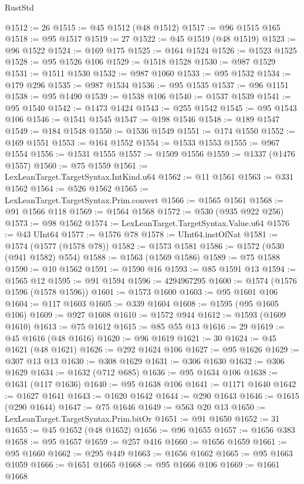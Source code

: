 \begin{lexlean}{RustStd}
\begin{coremodule}
{\begin{coremodule}
{{{{{{{{{{{{{{{{{{{{{{{{{{{{{{{{{{{{{{{@1512 := 26
@1515 := @45 @1512 (@48 @1512)
@1517 := @96 @1515 @165
@1518 := @95 @1517
@1519 := 27
@1522 := @45 @1519 (@48 @1519)
@1523 := @96 @1522
@1524 := @169 @175
@1525 := @164 @1524
@1526 := @1523 @1525
@1528 := @95 @1526 @106
@1529 := @1518 @1528
@1530 := @987 @1529
@1531 := @1511 @1530
@1532 := @987 @1060
@1533 := @95 @1532
@1534 := @179 @296
@1535 := @987 @1534
@1536 := @95 @1535
@1537 := @96 @1151
@1538 := @95 @1490
@1539 := @1538 @106
@1540 := @1537 @1539
@1541 := @95 @1540
@1542 := @1473 @1424
@1543 := @255 @1542
@1545 := @95 @1543 @106
@1546 := @1541 @1545
@1547 := @198 @1546
@1548 := @189 @1547
@1549 := @184 @1548
@1550 := @1536 @1549
@1551 := @174 @1550
@1552 := @169 @1551
@1553 := @164 @1552
@1554 := @1533 @1553
@1555 := @967 @1554
@1556 := @1531 @1555
@1557 := @1509 @1556
@1559 := @1337 (@1476 @1557)
@1560 := @75 @1559
@1561 := LexLeanTarget.TargetSyntax.IntKind.u64
@1562 := @11 @1561
@1563 := @331 @1562
@1564 := @526 @1562
@1565 := LexLeanTarget.TargetSyntax.Prim.convert
@1566 := @1565 @1561
@1568 := @91 @1566 @118
@1569 := @1564 @1568
@1572 := @530 (@935 @922 @256)
@1573 := @98 @1562
@1574 := LexLeanTarget.TargetSyntax.Value.u64
@1576 := @43 UInt64
@1577 := @1576 @78
@1578 := UInt64.instOfNat
@1581 := @1574 (@1577 (@1578 @78))
@1582 := @1573 @1581
@1586 := @1572 (@530 (@941 @1582) @554)
@1588 := @1563 (@1569 @1586)
@1589 := @75 @1588
@1590 := @10 @1562
@1591 := @1590 @16
@1593 := @85 @1591 @13
@1594 := @1565 @12
@1595 := @91 @1594
@1596 := 4294967295
@1600 := @1574 (@1576 @1596 (@1578 @1596))
@1601 := @1573 @1600
@1603 := @95 @1601 @106
@1604 := @117 @1603
@1605 := @339 @1604
@1608 := @1595 (@95 @1605 @106)
@1609 := @927 @1608
@1610 := @1572 @944
@1612 := @1593 (@1609 @1610)
@1613 := @75 @1612
@1615 := @85 @55 @13
@1616 := 29
@1619 := @45 @1616 (@48 @1616)
@1620 := @96 @1619
@1621 := 30
@1624 := @45 @1621 (@48 @1621)
@1626 := @292 @1624 @106
@1627 := @95 @1626
@1629 := @307 @13 @13
@1630 := @308 @1629
@1631 := @306 @1630
@1632 := @306 @1629
@1634 := @1632 (@712 @685)
@1636 := @95 @1634 @106
@1638 := @1631 (@117 @1636)
@1640 := @95 @1638 @106
@1641 := @1171 @1640
@1642 := @1627 @1641
@1643 := @1620 @1642
@1644 := @290 @1643
@1646 := @1615 (@290 @1644)
@1647 := @75 @1646
@1649 := @563 @20 @13
@1650 := LexLeanTarget.TargetSyntax.Prim.bitOr
@1651 := @91 @1650
@1652 := 31
@1655 := @45 @1652 (@48 @1652)
@1656 := @96 @1655
@1657 := @1656 @383
@1658 := @95 @1657
@1659 := @257 @416
@1660 := @1656 @1659
@1661 := @95 @1660
@1662 := @295 @449
@1663 := @1656 @1662
@1665 := @95 @1663 @1059
@1666 := @1651 @1665
@1668 := @95 @1666 @106
@1669 := @1661 @1668
}}}}}}}}}}}}}}}}}}}}}}}}}}}}}}}}}}}}}}}
\end{coremodule}}
\end{coremodule}
\end{lexlean}
